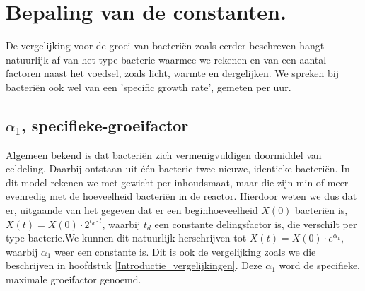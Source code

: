 
%
%

\chapter{Bepaling van de constanten.}
\label{Bepaling van de constanten}

De vergelijking voor de groei van bacteri\"en zoals eerder beschreven hangt natuurlijk af van het type bacterie waarmee we rekenen en van een aantal factoren naast het voedsel, zoals licht, warmte en dergelijken. We spreken bij bacteri\"en ook wel van een 'specific growth rate', gemeten per uur. 

\section{$\alpha_1$, specifieke-groeifactor}
Algemeen bekend is dat bacteri\"en zich vermenigvuldigen doormiddel van celdeling. Daarbij ontstaan uit \'e\'en bacterie twee nieuwe, identieke bacteri\"en. In dit model rekenen we met gewicht per inhoudsmaat, maar die zijn min of meer evenredig met de hoeveelheid bacteri\"en in de reactor. Hierdoor weten we dus dat er, uitgaande van het gegeven dat er een beginhoeveelheid $X(0)$ bacteri\"en is, $X(t) = X(0) \cdot 2^{t_d \cdot t}$, waarbij $t_d$ een constante delingsfactor is, die verschilt per type bacterie.We kunnen dit natuurlijk herschrijven tot $X(t) = X(0) \cdot e^{\alpha_1}$, waarbij $\alpha_1$ weer een constante is. Dit is ook de vergelijking zoals we die beschrijven in hoofdstuk \ref{Introductie_vergelijkingen}. Deze $\alpha_1$ word de specifieke, maximale groeifactor genoemd. 

